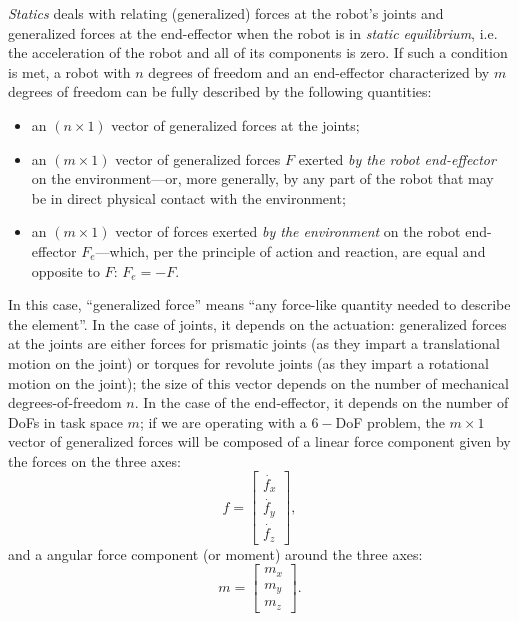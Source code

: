 \textsl{Statics} deals with relating (generalized) forces at the robot's joints and generalized forces at the end-effector when the robot is in \textsl{static equilibrium}, i.e. the acceleration of the robot and all of its components is zero.
If such a condition is met, a robot with $n$ degrees of freedom and an end-effector characterized by $m$ degrees of freedom can be fully described by the following quantities:
\begin{itemize}
    \item an $\left( n \times 1 \right)$ vector of generalized forces at the joints;
    \item an $\left( m \times 1 \right)$ vector of generalized forces $F$ exerted \textsl{by the robot end-effector} on the environment---or, more generally, by any part of the robot that may be in direct physical contact with the environment;
    \item an $\left( m \times 1 \right)$ vector of forces exerted \textsl{by the environment} on the robot end-effector $F_e$---which, per the principle of action and reaction, are equal and opposite to $F$: $F_e=-F$.
\end{itemize}
In this case, ``generalized force'' means ``any force-like quantity needed to describe the element''.
In the case of joints, it depends on the actuation: generalized forces at the joints are either forces for prismatic joints (as they impart a translational motion on the joint) or torques for revolute joints (as they impart a rotational motion on the joint); the size of this vector depends on the number of mechanical degrees-of-freedom $n$.
In the case of the end-effector, it depends on the number of DoFs in task space $m$; if we are operating with a $6-$DoF problem, the $m \times 1$ vector of generalized forces will be composed of a linear force component given by the forces on the three axes:
\begin{equation}
f=\left[\begin{array}{c}
\dot{f_x}\\
\dot{f_y}\\
\dot{f_z}
\end{array}
\right],
\end{equation}
and a angular force component (or moment) around the three axes:
\begin{equation}
m=\left[\begin{array}{c}
m_x\\
m_y\\
m_z
\end{array}
\right].
\end{equation}
